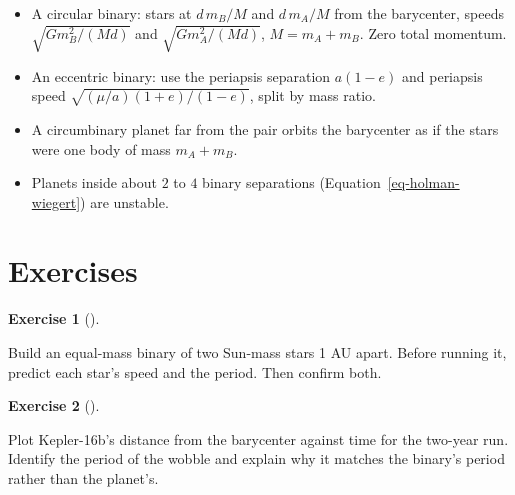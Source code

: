 \documentclass[
  10.5pt,
  letterpaper,
]{scrbook}
\providecommand{\tightlist}{%
  \setlength{\itemsep}{0pt}\setlength{\parskip}{0pt}}
\theoremstyle{definition}
\newtheorem{exercise}{Exercise}[chapter]
\theoremstyle{plain}
\theoremstyle{remark}
\begin{document}
\begin{tcolorbox}[enhanced jigsaw, arc=.35mm, bottomrule=.15mm, bottomtitle=1mm, breakable, colback=white, colbacktitle=quarto-callout-tip-color!10!white, colframe=quarto-callout-tip-color-frame, coltitle=black, left=2mm, leftrule=.75mm, opacityback=0, opacitybacktitle=0.6, rightrule=.15mm, title={Key results}, titlerule=0mm, toprule=.15mm, toptitle=1mm]

\begin{itemize}
\tightlist
\item
  A circular binary: stars at \(d\,m_B/M\) and \(d\,m_A/M\) from the
  barycenter, speeds \(\sqrt{G m_B^2/(Md)}\) and
  \(\sqrt{G m_A^2/(Md)}\), \(M = m_A + m_B\). Zero total momentum.
\item
  An eccentric binary: use the periapsis separation \(a(1-e)\) and
  periapsis speed \(\sqrt{(\mu/a)(1+e)/(1-e)}\), split by mass ratio.
\item
  A circumbinary planet far from the pair orbits the barycenter as if
  the stars were one body of mass \(m_A + m_B\).
\item
  Planets inside about \(2\) to \(4\) binary separations
  (Equation~\ref{eq-holman-wiegert}) are unstable.
\end{itemize}

\end{tcolorbox}

\section*{Exercises}\label{exercises-8}


\begin{exercise}[]\protect\hypertarget{exr-ch9-equal}{}\label{exr-ch9-equal}

Build an equal-mass binary of two Sun-mass stars 1 AU apart. Before
running it, predict each star's speed and the period. Then confirm both.

\end{exercise}

\begin{exercise}[]\protect\hypertarget{exr-ch9-wobble}{}\label{exr-ch9-wobble}

Plot Kepler-16b's distance from the barycenter against time for the
two-year run. Identify the period of the wobble and explain why it
matches the binary's period rather than the planet's.

\end{exercise}
\end{document}
